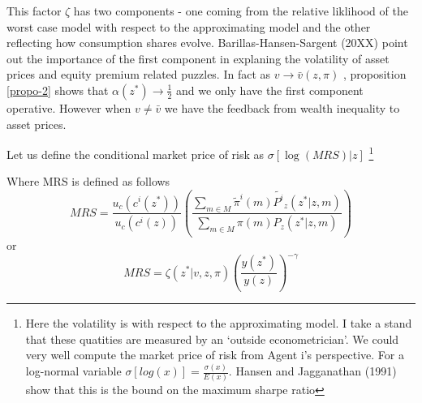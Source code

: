 \documentclass[12pt]{article}
\begin{document}


This factor $\zeta$ has two components - one coming from the relative liklihood of the worst case model with respect to the approximating model and the other reflecting how consumption shares evolve. Barillas-Hansen-Sargent (20XX) point out the importance of the first component in explaning the volatility of asset prices and equity premium related puzzles. In fact as $v\to \bar{v}(z,\pi)$ , proposition \ref{propo-2} shows that $\alpha(z^*)\to \frac{1}{2}$ and we only have the first component operative. However when $v\neq \bar{v}$ we have the feedback from wealth inequality to asset prices. 

Let us define the conditional market price of risk as $\sigma[\log(MRS)|z]$ \footnote{Here the volatility is with respect to the approximating model. I take a stand that these quatities are measured by an `outside econometrician'. We could very well compute the market price of risk from Agent i's perspective. For a log-normal variable $\sigma[log(x)]=\frac{\sigma(x)}{E(x)}$. Hansen and Jagganathan (1991) show that this is the bound on the maximum sharpe ratio}

Where MRS is defined as follows
\[MRS=\frac{u_c(c^i(z^*))}{u_c(c^i(z))}\left(\frac{\sum_{m \in M}\tilde{\pi}^{i}(m)\tilde{P^i}_z(z^* |z,m)}{\sum_{m \in M}{\pi(m)P_{z}(z^*|z,m)}} \right)\] 
or
\begin{equation}
MRS=\zeta(z^*|v,z,\pi)\left(\frac{y(z^*)}{y(z)}\right)^{-\gamma}
\end{equation}
\end{document}
